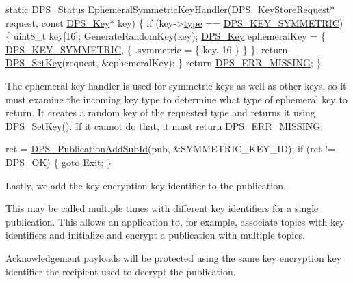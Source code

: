 \begin{DoxyCodeInclude}
\textcolor{keyword}{static} \hyperlink{group__status_ga30395a84d3cad9d4ec29848106415038}{DPS\_Status} EphemeralSymmetricKeyHandler(\hyperlink{group__keystore_ga7c3e50965b65334e9791780fa855ed16}{DPS\_KeyStoreRequest}* request, \textcolor{keyword}{
      const} \hyperlink{struct___d_p_s___key}{DPS\_Key}* key)
\{
    \textcolor{keywordflow}{if} (key->\hyperlink{struct___d_p_s___key_a347677e64145828ed5b1191a8fdc71d5}{type} == \hyperlink{group__keystore_gga7ca1045749c725e9c4a1b4758b2a0196a662c1e84628d96be8ae08163af382392}{DPS\_KEY\_SYMMETRIC}) \{
        uint8\_t key[16];
        GenerateRandomKey(key);
        \hyperlink{struct___d_p_s___key}{DPS\_Key} ephemeralKey = \{ \hyperlink{group__keystore_gga7ca1045749c725e9c4a1b4758b2a0196a662c1e84628d96be8ae08163af382392}{DPS\_KEY\_SYMMETRIC}, \{ .symmetric = \{ key, 16 \} \} \};
        \textcolor{keywordflow}{return} \hyperlink{group__keystore_ga15d6a9b8256b67c2ec8b1d365a98dbab}{DPS\_SetKey}(request, &ephemeralKey);
    \}
    \textcolor{keywordflow}{return} \hyperlink{group__status_ga5c46980c33492a8b76bffce081dbcba4}{DPS\_ERR\_MISSING};
\}
\end{DoxyCodeInclude}
The ephemeral key handler is used for symmetric keys as well as other keys, so it must examine the incoming {\ttfamily key} type to determine what type of ephemeral key to return. It creates a random key of the requested type and returns it using \hyperlink{group__keystore_ga15d6a9b8256b67c2ec8b1d365a98dbab}{D\+P\+S\+\_\+\+Set\+Key()}. If it cannot do that, it must return \hyperlink{group__status_ga5c46980c33492a8b76bffce081dbcba4}{D\+P\+S\+\_\+\+E\+R\+R\+\_\+\+M\+I\+S\+S\+I\+NG}.


\begin{DoxyCodeInclude}
            ret = \hyperlink{group__publication_ga91471ddf6f66798e255b28b3e913144b}{DPS\_PublicationAddSubId}(pub, &SYMMETRIC\_KEY\_ID);
            \textcolor{keywordflow}{if} (ret != \hyperlink{group__status_ga0ea3dd37bc558859ae0cb5a4f79a4bdd}{DPS\_OK}) \{
                \textcolor{keywordflow}{goto} Exit;
            \}
\end{DoxyCodeInclude}
Lastly, we add the key encryption key identifier to the publication.

This may be called multiple times with different key identifiers for a single publication. This allows an application to, for example, associate topics with key identifiers and initialize and encrypt a publication with multiple topics.

Acknowledgement payloads will be protected using the same key encryption key identifier the recipient used to decrypt the publication.

